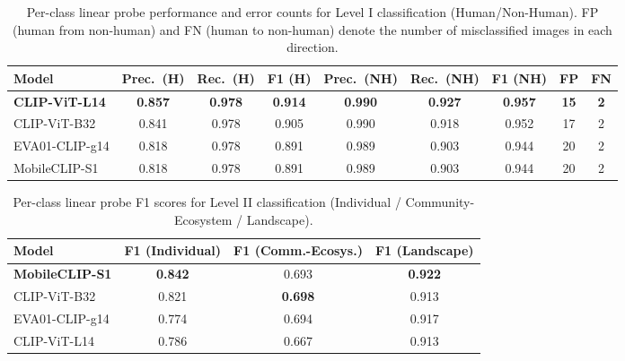 \documentclass[11pt]{article}
\renewcommand{\_}{\textunderscore\allowbreak{}}
\begin{document}
\begin{table}[htbp]
\centering\small
\caption{Per-class linear probe performance and error counts for Level I classification (Human/Non-Human). FP (human from non-human) and FN (human to non-human) denote the number of misclassified images in each direction.}
\label{tab:linearprobe_perclass_humannonhuman}
\begin{tabular}{@{}lcccccccc@{}}
\toprule
\textbf{Model} & \textbf{Prec.\ (H)} & \textbf{Rec.\ (H)} & \textbf{F1 (H)} & \textbf{Prec.\ (NH)} & \textbf{Rec.\ (NH)} & \textbf{F1 (NH)} & \textbf{FP} & \textbf{FN} \\
\midrule
\textbf{CLIP-ViT-L14}  & \textbf{0.857} & \textbf{0.978} & \textbf{0.914} & \textbf{0.990} & \textbf{0.927} & \textbf{0.957} & \textbf{15} & \textbf{2} \\
CLIP-ViT-B32           & 0.841 & 0.978 & 0.905 & 0.990 & 0.918 & 0.952 & 17 & 2 \\
EVA01-CLIP-g14         & 0.818 & 0.978 & 0.891 & 0.989 & 0.903 & 0.944 & 20 & 2 \\
MobileCLIP-S1          & 0.818 & 0.978 & 0.891 & 0.989 & 0.903 & 0.944 & 20 & 2 \\
\bottomrule
\end{tabular}
\end{table}

\begin{table}[htbp]
\centering\small
\caption{Per-class linear probe F1 scores for Level II classification (Individual / Community-Ecosystem / Landscape).}
\label{tab:linearprobe_perclass_indcoecoland}
\begin{tabular}{@{}lccc@{}}
\toprule
\textbf{Model} & \textbf{F1 (Individual)} & \textbf{F1 (Comm.-Ecosys.)} & \textbf{F1 (Landscape)} \\
\midrule
\textbf{MobileCLIP-S1}  & \textbf{0.842} & 0.693          & \textbf{0.922} \\
CLIP-ViT-B32            & 0.821          & \textbf{0.698} & 0.913          \\
EVA01-CLIP-g14          & 0.774          & 0.694          & 0.917          \\
CLIP-ViT-L14            & 0.786          & 0.667          & 0.913          \\
\bottomrule
\end{tabular}
\end{table}
\end{document}

